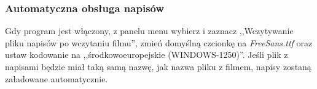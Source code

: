 \subsubsection{Automatyczna obsługa napisów}
Gdy program jest włączony, z panelu menu wybierz  i zaznacz ,,Wczytywanie pliku napisów po wczytaniu filmu'', zmień domyślną czcionkę na \textit{FreeSans.ttf} oraz ustaw kodowanie na ,,środkowoeuropejskie (WINDOWS-1250)''. Jeśli plik z napisami będzie miał taką samą nazwę, jak nazwa pliku z filmem, napisy zostaną załadowane automatycznie.
